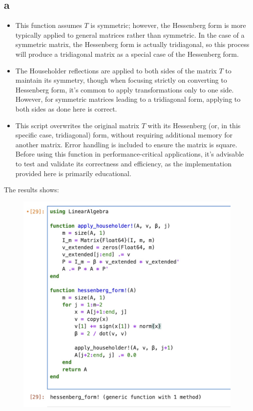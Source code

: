 \documentclass{article}
\begin{document}
\subsection{a}
\begin{itemize}
    \item This function assumes $T$ is symmetric; however, the Hessenberg form is more typically applied to general matrices rather than symmetric. In the case of a symmetric matrix, the Hessenberg form is actually tridiagonal, so this process will produce a tridiagonal matrix as a special case of the Hessenberg form. 
    \item The Householder reflections are applied to both sides of the matrix $T$ to maintain its symmetry, though when focusing strictly on converting to Hessenberg form, it's common to apply transformations only to one side. However, for symmetric matrices leading to a tridiagonal form, applying to both sides as done here is correct.
    \item This script overwrites the original matrix $T$ with its Hessenberg (or, in this specific case, tridiagonal) form, without requiring additional memory for another matrix.
Error handling is included to ensure the matrix is square.
Before using this function in performance-critical applications, it's advisable to test and validate its correctness and efficiency, as the implementation provided here is primarily educational.
\end{itemize}
The results shows:
\begin{figure}[H]
    \centering
    \includegraphics[width=0.75\linewidth]{Image 4-7-24 at 23.47.jpeg}
\end{figure}
\end{document}
